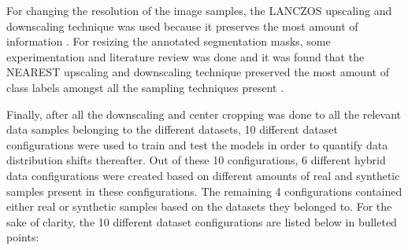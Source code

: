 \documentclass[conference]{IEEEtran}
\begin{document}
For changing the resolution of the image samples, the LANCZOS upscaling and downscaling technique was used because it preserves the most amount of information \cite{kuswantoriautomatic}. For resizing the annotated segmentation masks, some experimentation and literature review was done and it was found that the NEAREST upscaling and downscaling technique preserved the most amount of class labels amongst all the sampling techniques present \cite{rukundo2026beyond}. 

Finally, after all the downscaling and center cropping was done to all the relevant data samples belonging to the different datasets, 10 different dataset configurations were used to train and test the models in order to quantify data distribution shifts thereafter. Out of these 10 configurations, 6 different hybrid data configurations were created based on different amounts of real and synthetic samples present in these configurations. The remaining 4 configurations contained either real or synthetic samples based on the datasets they belonged to. For the sake of clarity, the 10 different dataset configurations are listed below in bulleted points: 
\end{document}
